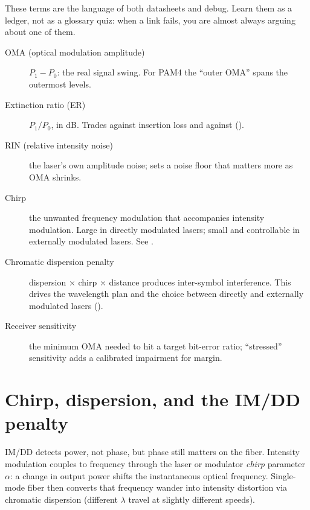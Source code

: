 These terms are the language of both datasheets and debug. Learn them as a
ledger, not as a glossary quiz: when a link fails, you are almost always arguing
about one of them.

\begin{description}
\item[OMA (optical modulation amplitude)]  $P_1 - P_0$: the real signal swing.
      For PAM4 the ``outer OMA'' spans the outermost levels.
\item[Extinction ratio (ER)]  $P_1/P_0$, in dB. Trades against insertion loss and
      against  ().
\item[RIN (relative intensity noise)]  the laser's own amplitude noise; sets a
      noise floor that matters more as OMA shrinks.
\item[Chirp] the unwanted frequency modulation that accompanies intensity
      modulation. Large in directly modulated lasers; small and controllable in
      externally modulated lasers. See .
\item[Chromatic dispersion penalty] dispersion $\times$ chirp $\times$ distance
      produces inter-symbol interference. This drives the wavelength plan and the
      choice between directly and externally modulated lasers ().
\item[Receiver sensitivity] the minimum OMA needed to hit a target bit-error
      ratio; ``stressed'' sensitivity adds a calibrated impairment for margin.
\end{description}



\section{Chirp, dispersion, and the IM/DD penalty}
\label{sec:chirp-dispersion}

IM/DD detects power, not phase, but phase still matters on the fiber. Intensity
modulation couples to frequency through the laser or modulator \emph{chirp}
parameter $\alpha$: a change in output power shifts the instantaneous optical
frequency. Single-mode fiber then converts that frequency wander into intensity
distortion via chromatic dispersion (different $\lambda$ travel at slightly
different speeds).

